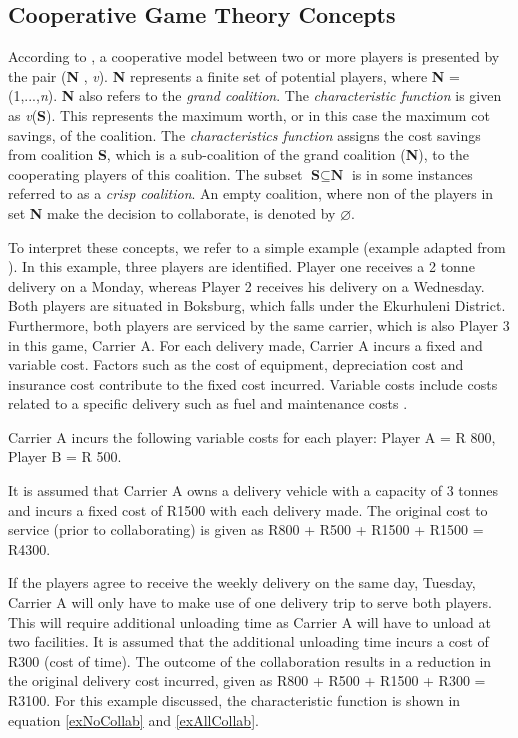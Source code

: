 \subsection{Cooperative Game Theory Concepts}
According to \citet{branzei2008models}, a cooperative model between two or more players is presented by the pair (\textbf{N} , \textit{v}). \textbf{N} represents a finite set of potential players, where \textbf{N} = (1,...,\textit{n}). \textbf{N} also refers to the \textit{grand coalition}. The \textit{characteristic function} is given as \textit{v}(\textbf{S}). This represents the maximum worth, or in this case the maximum cot savings, of the coalition. The \textit{characteristics function} assigns the cost savings from coalition \textbf{S}, which is a sub-coalition of the grand coalition (\textbf{N}), to the cooperating players of this coalition. The subset \(\textbf{S}\subseteq \textbf{N}\) is in some instances referred to as a \textit{crisp coalition}. An empty coalition, where non of the players in set \textbf{N} make the decision to collaborate, is denoted by $\varnothing$. \par

To interpret these concepts, we refer to a simple example (example adapted from \citet{bean2019behavioural}). In this example, three players are identified. Player one receives a 2 tonne delivery on a Monday, whereas Player 2 receives his delivery on a Wednesday. Both players are situated in Boksburg, which falls under the Ekurhuleni District. Furthermore, both players are serviced by the same carrier, which is also Player 3 in this game, Carrier A. For each delivery made, Carrier A incurs a fixed and variable cost. Factors such as the cost of equipment, depreciation cost and insurance cost contribute to the fixed cost incurred. Variable costs include costs related to a specific delivery such as fuel and maintenance costs \citep{bean2019behavioural}.\par
Carrier A incurs the following variable costs for each player: Player A = R 800, Player B = R 500.

It is assumed that Carrier A owns a delivery vehicle with a capacity of 3 tonnes and incurs a fixed cost of R1500 with each delivery made. The original cost to service (prior to collaborating) is given as R800 + R500 + R1500 + R1500 = R4300. \par

If the players agree to receive the weekly delivery on the same day, Tuesday, Carrier A will only have to make use of one delivery trip to serve both players. This will require additional unloading time as Carrier A will have to unload at two facilities. It is assumed that the additional unloading time incurs a cost of R300 (cost of time). The outcome of the collaboration results in a reduction in the original delivery cost incurred, given as R800 + R500 + R1500 + R300 = R3100. For this example discussed, the characteristic function is shown in equation \ref{exNoCollab} and \ref{exAllCollab}.

